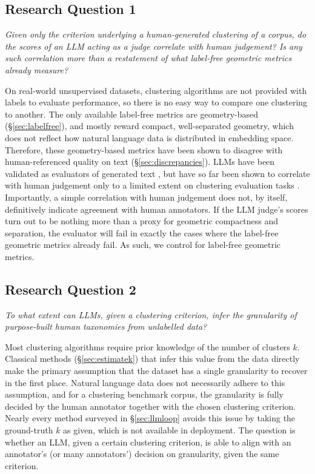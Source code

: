 \documentclass[11pt,a4paper,oneside]{report}
\begin{document}
\subsection{Research Question 1}

\emph{Given only the criterion underlying a human-generated clustering of a corpus, do the scores of an LLM acting as a judge correlate with human judgement? Is any such correlation more than a restatement of what label-free geometric metrics already measure?}                                                                                                                                                                                         

\vspace{\baselineskip}

On real-world unsupervised datasets, clustering algorithms are not provided with labels to evaluate performance, so there is no easy way to compare one clustering to another. The only available label-free metrics are geometry-based (\S\ref{sec:labelfree}), and mostly reward compact, well-separated geometry, which does not reflect how natural language data is distributed in embedding space. Therefore, these geometry-based metrics have been shown to disagree with human-referenced quality on text (\S\ref{sec:discrepancies}). LLMs have been validated as evaluators of generated text \citep{zheng2023judging}, but have so far been shown to correlate with human judgement only to a limited extent on clustering evaluation tasks \citep{hoyle2025proxann}. Importantly, a simple correlation with human judgement does not, by itself, definitively indicate agreement with human annotators. If the LLM judge's scores turn out to be nothing more than a proxy for geometric compactness and separation, the evaluator will fail in exactly the cases where the label-free geometric metrics already fail. As such, we control for label-free geometric metrics.

\subsection{Research Question 2}

\emph{To what extent can LLMs, given a clustering criterion, infer the granularity of purpose-built human taxonomies from unlabelled data?}

\vspace{\baselineskip}

Most clustering algorithms require prior knowledge of the number of clusters $k$. Classical methods (\S\ref{sec:estimatek}) that infer this value from the data directly make the primary assumption that the dataset has a single granularity to recover in the first place. Natural language data does not necessarily adhere to this assumption, and for a clustering benchmark corpus, the granularity is fully decided by the human annotator together with the chosen clustering criterion. Nearly every method surveyed in \S\ref{sec:llmloop} avoids this issue by taking the ground-truth $k$ as given, which is not available in deployment. The question is whether an LLM, given a certain clustering criterion, is able to align with an annotator's (or many annotators') decision on granularity, given the same criterion.
\end{document}

